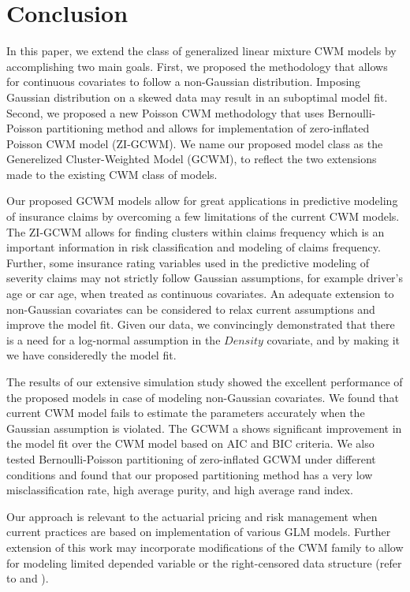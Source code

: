 \documentclass[11pt,letterpaper]{article}
\numberwithin{equation}{section}
\numberwithin{equation}{section}
\numberwithin{equation}{section}
\begin{document}
\section{Conclusion}

In this paper, we extend the class of generalized linear mixture CWM models by accomplishing two main goals. First, we proposed the methodology that allows for continuous covariates to follow a non-Gaussian distribution. Imposing Gaussian distribution on a skewed data may result in an suboptimal model fit. Second, we proposed a new Poisson CWM methodology that uses Bernoulli-Poisson partitioning method and allows for implementation of zero-inflated Poisson CWM model (ZI-GCWM). We name our proposed model class as the Generelized Cluster-Weighted Model (GCWM), to reflect the two extensions made to the existing CWM class of models.

Our proposed GCWM models allow for great applications in predictive modeling of insurance claims by overcoming a few limitations of the current CWM models. The ZI-GCWM allows for finding clusters within claims frequency which is an important information in risk classification and modeling of claims frequency. Further, some insurance rating variables used in the predictive modeling of severity claims may not strictly follow Gaussian assumptions, for example driver's age or car age, when treated as continuous covariates. An adequate extension to non-Gaussian covariates can be considered to relax current assumptions and improve the model fit. Given our data, we convincingly demonstrated that there is a need for a log-normal assumption in the $Density$ covariate, and by making it we have consideredly the model fit. 

The results of our extensive simulation study showed the excellent performance of the proposed models in case of modeling non-Gaussian covariates. We found  that current CWM model fails to estimate the parameters accurately when the Gaussian assumption is violated. The GCWM a shows significant improvement in the model fit over the CWM model based on AIC and BIC criteria. We also tested Bernoulli-Poisson partitioning of zero-inflated GCWM under different conditions and found that our proposed partitioning method has a very low misclassification rate, high average purity, and high average rand index.

Our approach is relevant to the actuarial pricing and risk management when current practices are based on implementation of various GLM models. Further extension of this work may incorporate modifications of the CWM family to allow for modeling limited depended variable or the right-censored data structure (refer to \cite{miljkovic2015} and \cite{miljkovic+orr:2017}).
\end{document}
